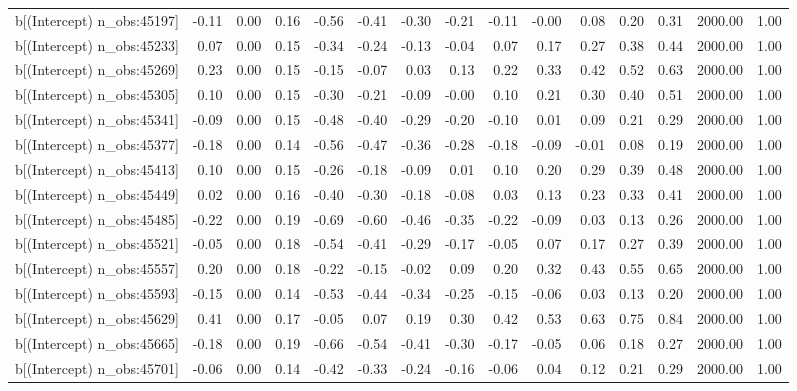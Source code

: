 \begin{table}[ht]
\begin{tabular}{rrrrrrrrrrrrrrr}
  b[(Intercept) n\_obs:45197] & -0.11 & 0.00 & 0.16 & -0.56 & -0.41 & -0.30 & -0.21 & -0.11 & -0.00 & 0.08 & 0.20 & 0.31 & 2000.00 & 1.00 \\ 
  b[(Intercept) n\_obs:45233] & 0.07 & 0.00 & 0.15 & -0.34 & -0.24 & -0.13 & -0.04 & 0.07 & 0.17 & 0.27 & 0.38 & 0.44 & 2000.00 & 1.00 \\ 
  b[(Intercept) n\_obs:45269] & 0.23 & 0.00 & 0.15 & -0.15 & -0.07 & 0.03 & 0.13 & 0.22 & 0.33 & 0.42 & 0.52 & 0.63 & 2000.00 & 1.00 \\ 
  b[(Intercept) n\_obs:45305] & 0.10 & 0.00 & 0.15 & -0.30 & -0.21 & -0.09 & -0.00 & 0.10 & 0.21 & 0.30 & 0.40 & 0.51 & 2000.00 & 1.00 \\ 
  b[(Intercept) n\_obs:45341] & -0.09 & 0.00 & 0.15 & -0.48 & -0.40 & -0.29 & -0.20 & -0.10 & 0.01 & 0.09 & 0.21 & 0.29 & 2000.00 & 1.00 \\ 
  b[(Intercept) n\_obs:45377] & -0.18 & 0.00 & 0.14 & -0.56 & -0.47 & -0.36 & -0.28 & -0.18 & -0.09 & -0.01 & 0.08 & 0.19 & 2000.00 & 1.00 \\ 
  b[(Intercept) n\_obs:45413] & 0.10 & 0.00 & 0.15 & -0.26 & -0.18 & -0.09 & 0.01 & 0.10 & 0.20 & 0.29 & 0.39 & 0.48 & 2000.00 & 1.00 \\ 
  b[(Intercept) n\_obs:45449] & 0.02 & 0.00 & 0.16 & -0.40 & -0.30 & -0.18 & -0.08 & 0.03 & 0.13 & 0.23 & 0.33 & 0.41 & 2000.00 & 1.00 \\ 
  b[(Intercept) n\_obs:45485] & -0.22 & 0.00 & 0.19 & -0.69 & -0.60 & -0.46 & -0.35 & -0.22 & -0.09 & 0.03 & 0.13 & 0.26 & 2000.00 & 1.00 \\ 
  b[(Intercept) n\_obs:45521] & -0.05 & 0.00 & 0.18 & -0.54 & -0.41 & -0.29 & -0.17 & -0.05 & 0.07 & 0.17 & 0.27 & 0.39 & 2000.00 & 1.00 \\ 
  b[(Intercept) n\_obs:45557] & 0.20 & 0.00 & 0.18 & -0.22 & -0.15 & -0.02 & 0.09 & 0.20 & 0.32 & 0.43 & 0.55 & 0.65 & 2000.00 & 1.00 \\ 
  b[(Intercept) n\_obs:45593] & -0.15 & 0.00 & 0.14 & -0.53 & -0.44 & -0.34 & -0.25 & -0.15 & -0.06 & 0.03 & 0.13 & 0.20 & 2000.00 & 1.00 \\ 
  b[(Intercept) n\_obs:45629] & 0.41 & 0.00 & 0.17 & -0.05 & 0.07 & 0.19 & 0.30 & 0.42 & 0.53 & 0.63 & 0.75 & 0.84 & 2000.00 & 1.00 \\ 
  b[(Intercept) n\_obs:45665] & -0.18 & 0.00 & 0.19 & -0.66 & -0.54 & -0.41 & -0.30 & -0.17 & -0.05 & 0.06 & 0.18 & 0.27 & 2000.00 & 1.00 \\ 
  b[(Intercept) n\_obs:45701] & -0.06 & 0.00 & 0.14 & -0.42 & -0.33 & -0.24 & -0.16 & -0.06 & 0.04 & 0.12 & 0.21 & 0.29 & 2000.00 & 1.00 \\ 

\end{tabular}
\end{table}
